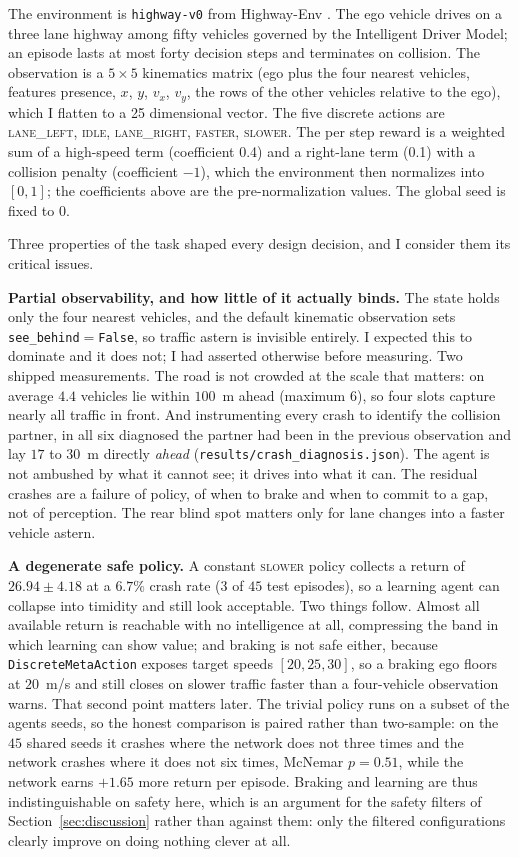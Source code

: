 \documentclass{article}
\begin{document}
The environment is \texttt{highway-v0} from Highway-Env \cite{highwayenv}. The ego vehicle drives on a three lane highway among fifty vehicles governed by the Intelligent Driver Model; an episode lasts at most forty decision steps and terminates on collision. The observation is a $5\times 5$ kinematics matrix (ego plus the four nearest vehicles, features presence, $x$, $y$, $v_x$, $v_y$, the rows of the other vehicles relative to the ego), which I flatten to a 25 dimensional vector. The five discrete actions are \textsc{lane\_left}, \textsc{idle}, \textsc{lane\_right}, \textsc{faster}, \textsc{slower}. The per step reward is a weighted sum of a high-speed term (coefficient 0.4) and a right-lane term (0.1) with a collision penalty (coefficient $-1$), which the environment then normalizes into $[0,1]$; the coefficients above are the pre-normalization values. The global seed is fixed to 0.

Three properties of the task shaped every design decision, and I consider them its critical issues.

\textbf{Partial observability, and how little of it actually binds.} The state holds only the four nearest vehicles, and the default kinematic observation sets \texttt{see\_behind}${=}$\texttt{False}, so traffic astern is invisible entirely. I expected this to dominate and it does not; I had asserted otherwise before measuring. Two shipped measurements. The road is not crowded at the scale that matters: on average $4.4$ vehicles lie within $100$~m ahead (maximum $6$), so four slots capture nearly all traffic in front. And instrumenting every crash to identify the collision partner, in all six diagnosed the partner had been in the previous observation and lay $17$ to $30$~m directly \emph{ahead} (\texttt{results/crash\_diagnosis.json}). The agent is not ambushed by what it cannot see; it drives into what it can. The residual crashes are a failure of policy, of when to brake and when to commit to a gap, not of perception. The rear blind spot matters only for lane changes into a faster vehicle astern.

\textbf{A degenerate safe policy.} A constant \textsc{slower} policy collects a return of $26.94\pm4.18$ at a $6.7\%$ crash rate ($3$ of $45$ test episodes), so a learning agent can collapse into timidity and still look acceptable. Two things follow. Almost all available return is reachable with no intelligence at all, compressing the band in which learning can show value; and braking is not safe either, because \texttt{DiscreteMetaAction} exposes target speeds $[20,25,30]$, so a braking ego floors at $20$~m/s and still closes on slower traffic faster than a four-vehicle observation warns. That second point matters later. The trivial policy runs on a subset of the agents seeds, so the honest comparison is paired rather than two-sample: on the $45$ shared seeds it crashes where the network does not three times and the network crashes where it does not six times, McNemar $p{=}0.51$, while the network earns $+1.65$ more return per episode. Braking and learning are thus indistinguishable on safety here, which is an argument for the safety filters of Section~\ref{sec:discussion} rather than against them: only the filtered configurations clearly improve on doing nothing clever at all.
\end{document}
